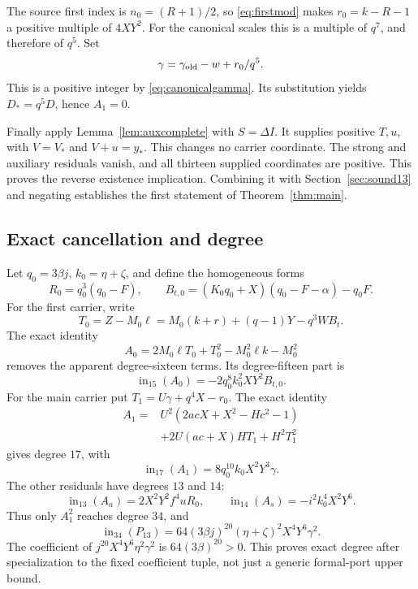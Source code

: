 \documentclass[11pt,a4paper]{article}
\theoremstyle{definition}
\theoremstyle{remark}
\newcommand{\ini}{\operatorname{in}}
\begin{document}
The source first index is \(n_0=(R+1)/2\), so
\eqref{eq:firstmod} makes \(r_0=k-R-1\) a positive multiple of
\(4XY^2\). For the canonical scales this is a multiple of \(q^7\),
and therefore of \(q^5\). Set
\begin{equation}
 \gamma=\gamma_{\rm old}-w+r_0/q^5.         \label{eq:gammacomplete}
\end{equation}
This is a positive integer by \eqref{eq:canonicalgamma}.
Its substitution yields \(D_*=q^5D\), hence \(A_1=0\).

Finally apply Lemma~\ref{lem:auxcomplete} with \(S=\Delta I\).
It supplies positive \(T,u\), with \(V=V_*\) and \(V+u=y_*\).
This changes no carrier coordinate. The strong and auxiliary residuals
vanish, and all thirteen supplied coordinates are positive.
This proves the reverse existence implication. Combining it with
Section~\ref{sec:sound13} and negating establishes the first statement of
Theorem~\ref{thm:main}.

\subsection{Exact cancellation and degree}
\label{sec:degree13}

Let \(q_0=3\beta j\), \(k_0=\eta+\zeta\), and define the homogeneous forms
\[
 R_0=q_0^3(q_0-F),\qquad
 B_{t,0}=(K_0q_0+X)(q_0-F-\alpha)-q_0F.
\]
For the first carrier, write
\[
 T_0=Z-M_0\ell=M_0(k+r)+(q-1)Y-q^3WB_t.
\]
The exact identity
\begin{equation}
 A_0=2M_0\ell T_0+T_0^2-M_0^2\ell k-M_0^2
                                                        \label{eq:A0cancel}
\end{equation}
removes the apparent degree-sixteen terms. Its degree-fifteen part is
\begin{equation}
 \ini_{15}(A_0)=-2q_0^8k_0^2XY^2B_{t,0}.    \label{eq:headA0}
\end{equation}
For the main carrier put \(T_1=U\gamma+q^4X-r_0\).
The exact identity
\begin{equation}
 \begin{split}
 A_1={}&U^2(2acX+X^2-Hc^2-1)\\
       &+2U(ac+X)HT_1+H^2T_1^2
 \end{split}                               \label{eq:A1cancel}
\end{equation}
gives degree \(17\), with
\begin{equation}
 \ini_{17}(A_1)=8q_0^{10}k_0X^2Y^3\gamma.   \label{eq:headA1}
\end{equation}
The other residuals have degrees \(13\) and \(14\):
\[
 \ini_{13}(A_a)=2X^2Y^2f^4uR_0,\qquad
 \ini_{14}(A_s)=-i^2k_0^4X^2Y^6.
\]
Thus only \(A_1^2\) reaches degree \(34\), and
\begin{equation}
 \ini_{34}(P_{13})
   =64(3\beta j)^{20}(\eta+\zeta)^2X^4Y^6\gamma^2.
                                                        \label{eq:head13}
\end{equation}
The coefficient of
\(j^{20}X^4Y^6\eta^2\gamma^2\) is \(64(3\beta)^{20}>0\).
This proves exact degree after specialization to the fixed coefficient
tuple, not just a generic formal-port upper bound.
\end{document}
